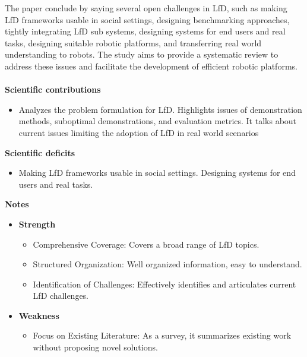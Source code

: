 \documentclass[report.tex]{subfiles}
\begin{document}
The paper conclude by saying several open challenges in LfD, such as making LfD frameworks usable in social settings, designing benchmarking approaches, tightly integrating LfD sub systems, designing systems for end users and real tasks, designing suitable robotic platforms, and transferring real world understanding to robots. The study aims to provide a systematic review to address these issues and facilitate the development of efficient robotic platforms.
\\\\

\noindent\textbf{Scientific contributions} 
\begin{itemize}
        \item Analyzes the problem formulation for LfD. 
    Highlights issues of demonstration methods, suboptimal demonstrations, and evaluation metrics.
     It talks about current issues limiting the adoption of LfD in real world scenarios

        
        
\end{itemize}

\noindent\textbf{Scientific deficits} 
\begin{itemize}
        \item Making LfD frameworks usable in social settings.
     Designing systems for end users and real tasks.
        
        
       
\end{itemize}

\noindent\textbf{Notes}
\begin{itemize}
    \item \noindent\textbf {Strength}
    \begin{itemize}
        \item Comprehensive Coverage: Covers a broad range of LfD topics.
        \item Structured Organization: Well  organized information, easy to understand.
        \item Identification of Challenges: Effectively identifies and articulates current LfD challenges.
    \end{itemize}
    
    \item \noindent\textbf{Weakness}
    \begin{itemize}
        \item Focus on Existing Literature: As a survey, it summarizes existing work without proposing novel solutions. 
    \end{itemize}
\end{itemize}
\end{document}
